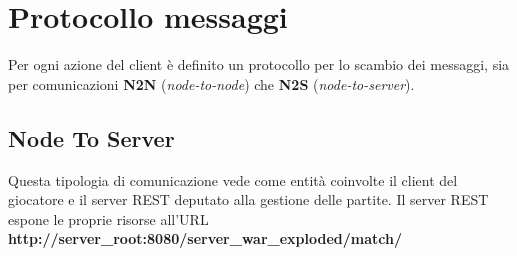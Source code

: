 \documentclass[a4paper]{report}
\begin{document}
\chapter{Protocollo messaggi}
Per ogni azione del client è definito un protocollo per lo scambio dei messaggi, sia per comunicazioni \textbf{N2N} (\textit{node-to-node}) che \textbf{N2S} (\textit{node-to-server}).

\section{Node To Server}

Questa tipologia di comunicazione vede come entità coinvolte il client del giocatore e il server REST deputato alla gestione delle partite.\newline
Il server REST espone le proprie risorse all'URL \textbf{http://server\_root:8080/server\_war\_exploded/match/}
\end{document}
